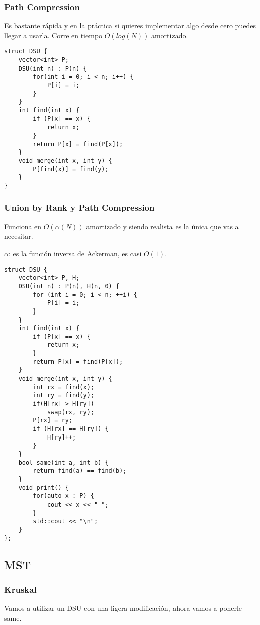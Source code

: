 \documentclass[11pt]{article}
\begin{document}
\subsubsection{Path Compression}
\label{sec:org5e0c0c8}

Es bastante rápida y en la práctica si quieres implementar algo desde
cero puedes llegar a usarla. Corre en tiempo \(O(log(N))\) amortizado.

\lstset{language=C++,label= ,caption= ,captionpos=b,numbers=none}
\begin{lstlisting}
struct DSU {
	vector<int> P;
	DSU(int n) : P(n) {
		for(int i = 0; i < n; i++) {
			P[i] = i;
		}
	}
	int find(int x) {
		if (P[x] == x) {
			return x;
		}
		return P[x] = find(P[x]);
	}
	void merge(int x, int y) {
		P[find(x)] = find(y);
	}
}
\end{lstlisting}
\subsubsection{Union by Rank y Path Compression}
\label{sec:org53fd00b}

Funciona en \(O(\alpha(N))\) amortizado y siendo realista es la única que vas a necesitar.

\(\alpha\): es la función inversa de Ackerman, es casi \(O(1)\).

\lstset{language=C++,label= ,caption= ,captionpos=b,numbers=none}
\begin{lstlisting}
struct DSU {
	vector<int> P, H;
	DSU(int n) : P(n), H(n, 0) {
		for (int i = 0; i < n; ++i) {
			P[i] = i;
		}
	}
	int find(int x) {
		if (P[x] == x) {
			return x;
		}
		return P[x] = find(P[x]);
	}
	void merge(int x, int y) {
		int rx = find(x);
		int ry = find(y);
		if(H[rx] > H[ry])
			swap(rx, ry);
		P[rx] = ry;
		if (H[rx] == H[ry]) {
			H[ry]++;
		}
	}
	bool same(int a, int b) {
		return find(a) == find(b);
	}
	void print() {
		for(auto x : P) {
			cout << x << " ";
		}
		std::cout << "\n";
	}
};
\end{lstlisting}

\subsection{MST}
\label{sec:org1f8e89b}
\subsubsection{Kruskal}
\label{sec:org4a3af96}

Vamos a utilizar un DSU con una ligera modificación,
ahora vamos a ponerle same.
\end{document}
